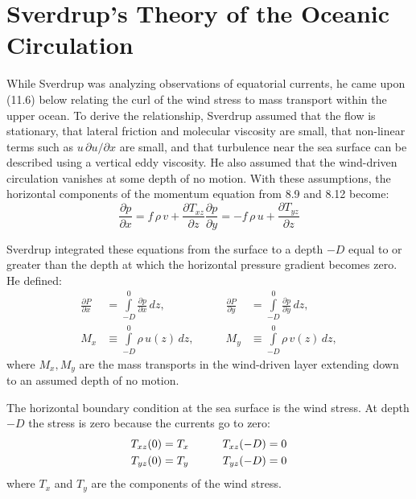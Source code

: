 \section{Sverdrup's Theory of the Oceanic Circulation}
While Sverdrup was
analyzing observations of equatorial currents, he came upon (11.6)
below relating the curl of the wind stress
to mass transport within the upper ocean. To
derive the relationship, Sverdrup assumed that the flow is stationary,
that lateral friction and molecular viscosity are small, that
non-linear terms such as $u\, \partial{u} / \partial{x}$ are small,
and that turbulence near the sea surface can
be described using a vertical eddy viscosity. He also assumed that the
wind-driven circulation vanishes at some depth of no motion. With
these assumptions, the horizontal components of the momentum equation
from 8.9 and 8.12 become:
\begin{subequations}
\begin{equation}
\frac{\partial{p}}{\partial{x}} =  f\,\rho\,v + \frac{\partial{T_{xz}}}{\partial{z}}
\end{equation}
\begin{equation}
\frac{\partial{p}}{\partial{y}} = -f\,\rho\,u + \frac{\partial{T_{yz}}}{\partial{z}}
\end{equation}
\end{subequations}

Sverdrup integrated these equations from the surface to a depth $-D$
equal to or greater than the depth at which the horizontal pressure
gradient becomes zero. He defined:
\begin{subequations}
\begin{alignat}{2}
\frac{\partial{P}}{\partial{x}} &= \int\limits_{-D}^{0} \frac{\partial{p}}{\partial{x}}\,dz,  &\qquad
\frac{\partial{P}}{\partial{y}} &= \int\limits_{-D}^{0} \frac{\partial{p}}{\partial{y}}\,dz,  \\
M_x &\equiv \int\limits_{-D}^{0} \rho\,u(z)\,dz,          &\qquad M_y &\equiv \int\limits_{-D}^{0} \rho\,v(z)\,dz,
\end{alignat}
\end{subequations}
where $M_x, M_y$ are the mass transports in
the wind-driven layer extending down to an assumed depth of no motion.

The horizontal boundary condition at the sea surface is the wind
stress. At depth $-D$ the stress is zero because
the currents go to zero:
\begin{alignat}{2}
T_{xz}(0) &= T_x & \qquad T_{xz}(-D) &= 0
\notag \\
T_{yz}(0) &= T_y & \qquad T_{yz}(-D) &= 0
\end{alignat}
where $T_x$ and $T_y$ are the components of the wind stress.


